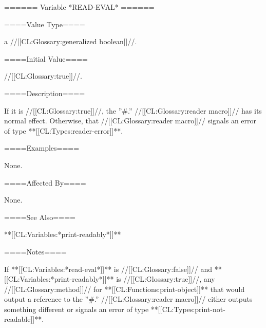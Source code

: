 ====== Variable *READ-EVAL* ======

====Value Type====

a //[[CL:Glossary:generalized boolean]]//.

====Initial Value====

//[[CL:Glossary:true]]//.

====Description====

If it is //[[CL:Glossary:true]]//, the ''#.'' //[[CL:Glossary:reader macro]]// has its normal effect. Otherwise, that //[[CL:Glossary:reader macro]]// signals an error of type **[[CL:Types:reader-error]]**.

====Examples====

None.

====Affected By====

None.

====See Also====

**[[CL:Variables:*print-readably*]]**

====Notes====

If **[[CL:Variables:*read-eval*]]** is //[[CL:Glossary:false]]// and **[[CL:Variables:*print-readably*]]** is //[[CL:Glossary:true]]//, any //[[CL:Glossary:method]]// for **[[CL:Functions:print-object]]** that would output a reference to the ''#.'' //[[CL:Glossary:reader macro]]// either outputs something different or signals an error of type **[[CL:Types:print-not-readable]]**.

